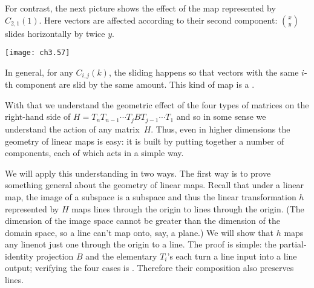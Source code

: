 For contrast, the next picture shows the effect of the map represented by 
$C_{2,1}(1)$.
Here vectors are affected according to their  
second component:
$\binom{x}{y}$ slides horizontally by twice $y$.
\begin{center}
  \texttt{[image: ch3.57]}
\end{center}
In general, for any $C_{i,j}(k)$, the
sliding happens so that vectors with the same $i$-th component
are slid by the same amount.
This kind of map is a 
.

With that we understand the geometric effect of the four types 
of matrices on the right-hand side of
$H=T_nT_{n-1}\cdots T_jBT_{j-1}\cdots T_1$
and so in some sense we understand  
the action of any matrix~$H$.
Thus, even in higher dimensions the geometry of linear maps is easy: it 
is built by putting
together a number of components, each of which acts in a simple way.

We will apply this understanding in two ways.
The first way is to prove something general about 
the geometry of linear maps. 
Recall that under a linear map, the image of a subspace is a subspace
and thus the linear transformation $h$ represented by $H$ maps lines 
through the origin to lines through the origin.
(The dimension of the image space cannot be greater than 
the dimension of the domain space, so a line can't map onto, say, a plane.)
We will show that $h$ maps any line\Dash not just one through the origin\Dash 
to a line.
The proof is simple:
the partial-identity projection $B$ and the elementary $T_i$'s
each turn a line input into a line output; 
verifying the four cases is .
Therefore their composition also preserves lines.

